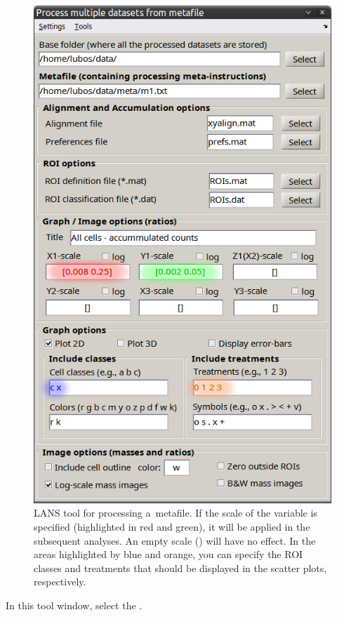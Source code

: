 \begin{figure}[!ht]
\centering
\includegraphics[scale=0.4]{figs3/LANS-process-metafile}
\caption{\label{fig:process-metafile}%
LANS tool for processing a~metafile. If the scale of the variable is specified (highlighted in red and green), it will be applied in the subsequent analyses. An empty scale (\ttt{[]}) will have no effect. In the areas highlighted by blue and orange, you can specify the ROI classes and treatments that should be displayed in the scatter plots, respectively.}
\end{figure}

\s In this tool window, select the .

